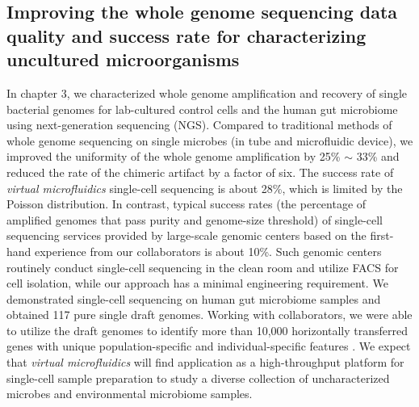 \subsection{Improving the whole genome sequencing data quality and success rate for characterizing uncultured microorganisms}
In chapter 3, we characterized whole genome amplification and recovery of single bacterial genomes for lab-cultured control cells and the human gut microbiome using next-generation sequencing (NGS). Compared to traditional methods of whole genome sequencing on single microbes (in tube and microfluidic device), we improved the uniformity of the whole genome amplification by 25\% $\sim$ 33\% and reduced the rate of the chimeric artifact by a factor of six. The success rate of \textit{virtual microfluidics} single-cell sequencing is about 28\%, which is limited by the Poisson distribution. In contrast, typical success rates (the percentage of amplified genomes that pass purity and genome-size threshold) of single-cell sequencing services provided by large-scale genomic centers based on the first-hand experience from our collaborators is about 10\%. Such genomic centers routinely conduct single-cell sequencing in the clean room and utilize FACS for cell isolation, while our approach has a minimal engineering requirement. We demonstrated single-cell sequencing on human gut microbiome samples and obtained 117 pure single draft genomes. Working with collaborators, we were able to utilize the draft genomes to identify more than 10,000 horizontally transferred genes with unique population-specific and individual-specific features \cite{Brito:2016cd}. We expect that \textit{virtual microfluidics} will find application as a high-throughput platform for single-cell sample preparation to study a diverse collection of uncharacterized microbes and environmental microbiome samples. 

